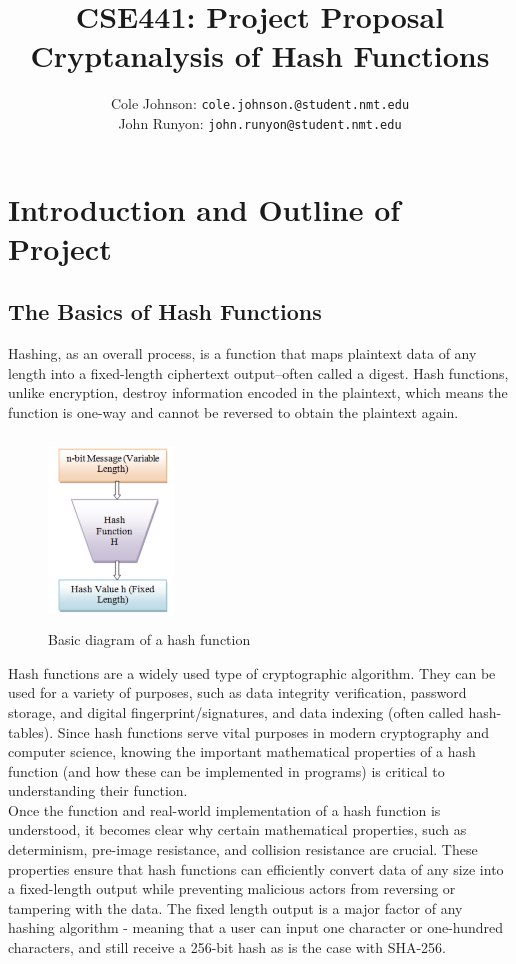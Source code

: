 \documentclass[12pt,english]{article}
\author{
    Cole Johnson: \texttt{cole.johnson.@student.nmt.edu}
    \\ 
    John Runyon: \texttt{john.runyon@student.nmt.edu}
}
\title{
    CSE441: Project Proposal\\
    \large{Cryptanalysis of Hash Functions}
}
\begin{document}
\maketitle
\section*{Introduction and Outline of Project}
\subsection{The Basics of Hash Functions}
Hashing, as an overall process, is a function that maps
plaintext data of any length into a fixed-length ciphertext
output--often called a digest. Hash functions, unlike encryption,
destroy information encoded in the plaintext, which means
the function is one-way and cannot be reversed to obtain
the plaintext again.

\begin{figure}
    \begin{center}
      \includegraphics[clip=true,height=5cm, width=0.3\textwidth]{images/hash_function.png}
    \end{center}
    \caption{Basic diagram of a hash function}
  \end{figure}

Hash functions are a widely used type of cryptographic algorithm.
They can be used for a variety of purposes, such as
data integrity verification, password storage, and digital
fingerprint/signatures, and data indexing (often called hash-tables).
Since hash functions serve vital purposes in modern cryptography
and computer science, knowing the important mathematical properties
of a hash function (and how these can be implemented in programs)
is critical to understanding their function. \\ 

Once the function and real-world implementation of a hash function is understood, it becomes clear why certain mathematical properties, such as determinism, pre-image resistance, and collision resistance are crucial. These properties ensure that hash functions can efficiently convert data of any size into a fixed-length output while preventing malicious actors from reversing or tampering with the data. The fixed length output is a major factor of any hashing algorithm - meaning that a user can input one character or one-hundred characters, and still receive a 256-bit hash as is the case with SHA-256.
\end{document}
